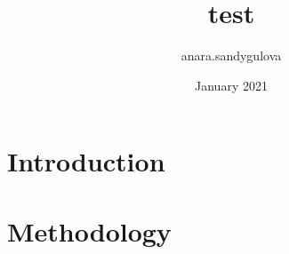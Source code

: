 \documentclass{article}
\title{test}
\author{anara.sandygulova }
\date{January 2021}
\begin{document}
\maketitle

\section{Introduction}

\section{Methodology}
\end{document}
